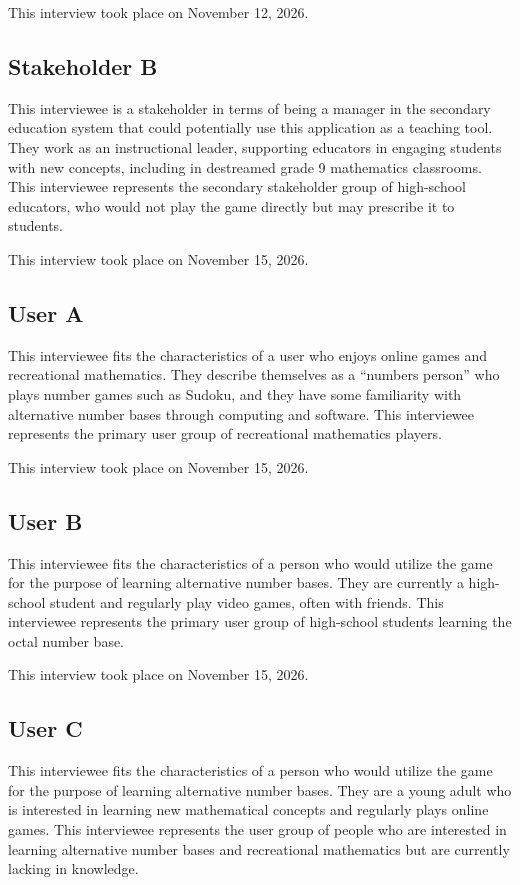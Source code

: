 \documentclass{article}
\begin{document}
This interview took place on November 12, 2026.

\subsection{Stakeholder B}

This interviewee is a stakeholder in terms of being a manager in the secondary education system that could potentially use this application as a teaching tool. They work as an instructional leader, supporting educators in engaging students with new concepts, including in destreamed grade 9 mathematics classrooms. This interviewee represents the secondary stakeholder group of high-school educators, who would not play the game directly but may prescribe it to students.

This interview took place on November 15, 2026.

\subsection{User A}

This interviewee fits the characteristics of a user who enjoys online games and recreational mathematics. They describe themselves as a ``numbers person'' who plays number games such as Sudoku, and they have some familiarity with alternative number bases through computing and software. This interviewee represents the primary user group of recreational mathematics players.

This interview took place on November 15, 2026.

\subsection{User B}

This interviewee fits the characteristics of a person who would utilize the game for the purpose of learning alternative number bases. They are currently a high-school student and regularly play video games, often with friends. This interviewee represents the primary user group of high-school students learning the octal number base.

This interview took place on November 15, 2026.

\subsection{User C}

This interviewee fits the characteristics of a person who would utilize the game for the purpose of learning alternative number bases. They are a young adult who is interested in learning new mathematical concepts and regularly plays online games. This interviewee represents the user group of people who are interested in learning alternative number bases and recreational mathematics but are currently lacking in knowledge.
\end{document}
